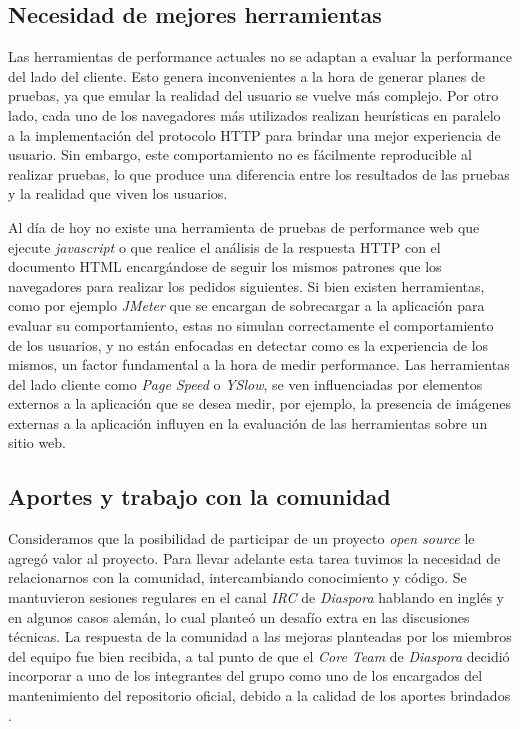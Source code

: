 \subsection{Necesidad de mejores herramientas}
Las herramientas de performance actuales no se adaptan a evaluar la performance del lado del cliente. Esto
genera inconvenientes a la hora de generar planes de pruebas, ya que emular la realidad del usuario se vuelve más complejo. Por otro lado, cada uno de los navegadores más
utilizados realizan heurísticas en paralelo a la implementación del protocolo HTTP para brindar una mejor experiencia de usuario. Sin embargo, este comportamiento
no es fácilmente reproducible al realizar pruebas, lo que produce una diferencia entre los resultados de las pruebas y la realidad que viven los usuarios.

Al día de hoy no existe una herramienta de pruebas de performance web que ejecute \emph{javascript} o que realice el análisis de la respuesta HTTP con el documento HTML encargándose de seguir los mismos patrones que los navegadores para realizar los pedidos siguientes. Si bien existen herramientas, como por ejemplo \emph{JMeter} que se encargan de sobrecargar a la aplicación para evaluar su comportamiento, estas no simulan correctamente el comportamiento de los usuarios, y no están enfocadas en detectar como es la experiencia de los mismos, un factor fundamental a la hora de medir performance. Las herramientas del lado cliente como
\emph{Page Speed} o \emph{YSlow}, se ven influenciadas por elementos externos a la aplicación que se desea medir, por ejemplo, la presencia de imágenes externas a la aplicación influyen en la evaluación de las herramientas sobre un sitio web.

\subsection{Aportes y trabajo con la comunidad}
Consideramos que la posibilidad de participar de un proyecto \emph{open source} le agregó valor al proyecto. Para llevar adelante esta tarea tuvimos la necesidad de relacionarnos con la comunidad, intercambiando conocimiento y código. Se mantuvieron sesiones regulares en el canal
\emph{IRC} de \emph{Diaspora} hablando en inglés y en algunos casos alemán, lo cual planteó un desafío extra en las discusiones técnicas. 
La respuesta de la comunidad a las mejoras planteadas por los miembros del equipo fue bien recibida, a tal punto de que el \emph{Core Team} de \emph{Diaspora}
decidió incorporar a uno de los integrantes del grupo como uno de los encargados del mantenimiento del repositorio oficial, debido a la calidad de los aportes brindados \cite{loomio_fabian}. 

